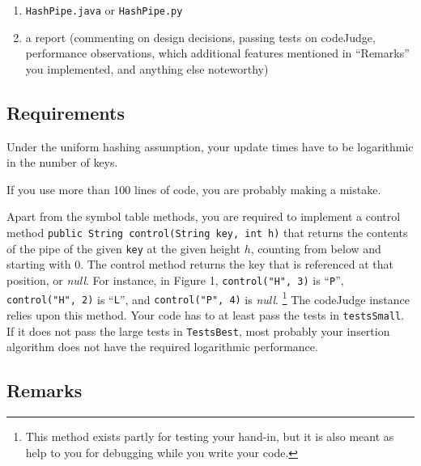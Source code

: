 \documentclass{tufte-handout}
\begin{document}
\begin{enumerate}
\item {\tt HashPipe.java} or {\tt HashPipe.py} 
\item a report (commenting on design decisions, passing tests on codeJudge, performance observations, which additional features mentioned in ``Remarks'' you implemented, and anything else noteworthy) 
\end{enumerate}

\subsection{Requirements}

Under the uniform hashing assumption, your update times have to be logarithmic in the number of keys.

If you use more than 100 lines of code, you are probably making a mistake.

Apart from the symbol table methods, you are required to implement a control method {\tt public String control(String key, int h)} that returns the contents of the pipe of the given {\tt key} at the given height $h$, counting from below and starting with $0$.
The control method returns the key that is referenced at that position, or \emph{null}.
For instance, in Figure 1, {\tt control("H", 3)} is ``{\tt P}'', {\tt control("H", 2)} is ``{\tt L}'', and {\tt control("P", 4)} is \emph{null}.
\footnote{This method exists partly for testing your hand-in, but it is also meant as help to you for debugging while you write your code.}
The codeJudge instance relies upon this method. 
Your code has to at least pass the tests in \texttt{testsSmall}.
If it does not pass the large tests in \texttt{TestsBest}, most probably your insertion algorithm does not have the required logarithmic performance.
\subsection{Remarks}
\end{document}
